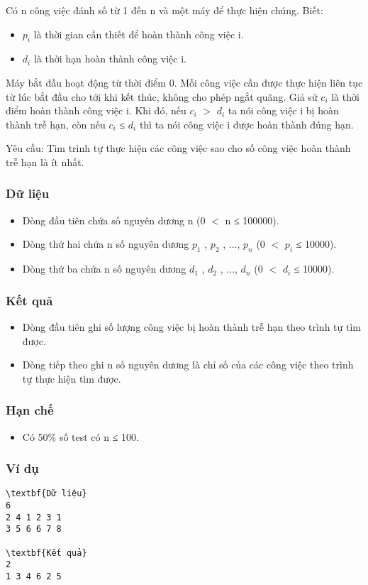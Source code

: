 



   Có n công việc đánh số từ 1 đến n và một máy để thực hiện chúng. Biết:  
\begin{itemize}
	\item     $p_{i}$    là thời gian cần thiết để hoàn thành công việc i.   
	\item     $d_{i}$    là thời hạn hoàn thành công việc i.   
\end{itemize}

   Máy bắt đầu hoạt động từ thời điểm 0. Mỗi công việc cần được thực hiện liên tục từ lúc bắt đầu cho tới khi kết thúc, không cho phép ngắt quãng. Giả sử $c_{i}$   là thời điểm hoàn thành công việc i. Khi đó, nếu $c_{i}$   $>$  $d_{i}$   ta nói công việc i bị hoàn thành trễ hạn, còn nếu  $c_{i}$   ≤ $d_{i}$   thì ta nói công việc i được hoàn thành đúng hạn.  

   Yêu cầu: Tìm trình tự thực hiện các công việc sao cho số công việc hoàn thành trễ hạn là ít nhất.  

\subsubsection{   Dữ liệu  }
\begin{itemize}
	\item     Dòng đầu tiên chứa số nguyên dương n (0 $<$ n ≤ 100000).   
	\item     Dòng thứ hai chứa n số nguyên dương $p_{1}$    , $p_{2}$    , ..., $p_{n}$    (0 $<$ $p_{i}$    ≤ 10000).   
	\item     Dòng thứ ba chứa n số nguyên dương $d_{1}$    , $d_{2}$    , ..., $d_{n}$    (0 $<$ $d_{i}$    ≤ 10000).   
\end{itemize}

\subsubsection{   Kết quả  }
\begin{itemize}
	\item     Dòng đầu tiên ghi số lượng công việc bị hoàn thành trễ hạn theo trình tự tìm được.   
	\item     Dòng tiếp theo ghi n số nguyên dương là chỉ số của các công việc theo trình tự thực hiện tìm được.   
\end{itemize}

\subsubsection{   Hạn chế  }
\begin{itemize}
	\item     Có 50\% số test có n ≤ 100.   
\end{itemize}

\subsubsection{   Ví dụ  }
\begin{verbatim}
\textbf{Dữ liệu}
6
2 4 1 2 3 1
3 5 6 6 7 8

\textbf{Kết quả}
2
1 3 4 6 2 5
\end{verbatim}
